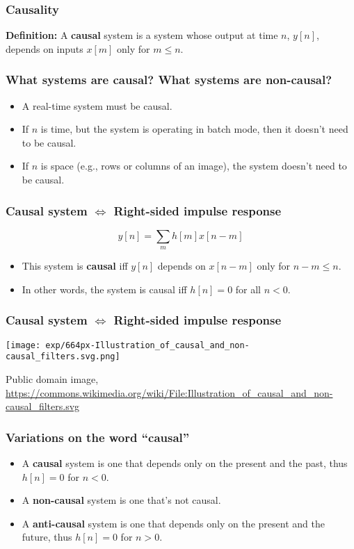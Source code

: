 \documentclass{beamer}
\begin{document}
\begin{frame}
  \frametitle{Causality}

  {\bf Definition:} A {\bf causal} system is a system whose output at
  time $n$, $y[n]$, depends on inputs $x[m]$ only for $m\le n$.
\end{frame}
  
\begin{frame}
  \frametitle{What systems are causal?  What systems are non-causal?}

  \begin{itemize}
  \item A real-time system must be causal.
  \item If $n$ is time, but the system is operating in batch mode,
    then it doesn't need to be causal.
  \item If $n$ is space (e.g., rows or columns of an image), the
    system doesn't need to be causal.
  \end{itemize}
\end{frame}

\begin{frame}
  \frametitle{Causal system $\Leftrightarrow$ Right-sided impulse response}

  \begin{displaymath}
    y[n] = \sum_m h[m]x[n-m]
  \end{displaymath}
  \begin{itemize}
    \item This system is {\bf causal} iff $y[n]$ depends on $x[n-m]$
      only for $n-m\le n$.
    \item In other words, the system is causal iff $h[n]=0$ for all $n<0$.
  \end{itemize}
\end{frame}

\begin{frame}
  \frametitle{Causal system $\Leftrightarrow$ Right-sided impulse response}

  \begin{center}
    \texttt{[image: exp/664px-Illustration\_of\_causal\_and\_non-causal\_filters.svg.png]}

    {\tiny Public domain image, \url{https://commons.wikimedia.org/wiki/File:Illustration_of_causal_and_non-causal_filters.svg}}
  \end{center}
\end{frame}

\begin{frame}
  \frametitle{Variations on the word ``causal''}

  \begin{itemize}
  \item A {\bf causal} system is one that depends only on the present
    and the past, thus $h[n]=0$ for $n<0$.
  \item A {\bf non-causal} system is one that's not causal.
  \item A {\bf anti-causal} system is one that depends only on the
    present and the future, thus $h[n]=0$ for $n>0$.
  \end{itemize}
\end{frame}
\end{document}
